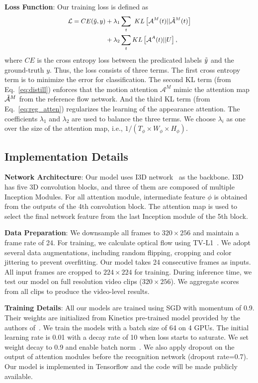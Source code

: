 \documentclass[10pt,twocolumn,letterpaper]{article}
\begin{document}
\noindent \textbf{Loss Function}: Our training loss is defined as
\begin{equation}
\small
\begin{split}
    \mathcal{L} = CE(\Tilde{y}, y) &+ \lambda_1 \sum_t\  KL\left[ \mathcal{A}^M(t)||\mathcal{\Tilde{A}}^M(t) \right] \\
                  & + \lambda_2 \sum_t KL\left[ \mathcal{A}^A(t)||U \right],
\end{split}
\end{equation}
where $CE$ is the cross entropy loss between the predicated labels $\Tilde{y}$ and the ground-truth $y$. Thus, the loss consists of three terms. The first cross entropy term is to minimize the error for classification. The second KL term (from Eq.\ \ref{eq:distill}) enforces that the motion attention $\mathcal{A}^M$ mimic the attention map $\mathcal{\Tilde{A}}^M$ from the reference flow network. And the third KL term (from Eq.\ \ref{eq:reg_atten}) regularizes the learning of the appearance attention. The coefficients $\lambda_1$ and $\lambda_2$ are used to balance the three terms. We choose $\lambda_{i}$ as one over the size of the attention map, i.e., $1/(T_\phi\times W_\phi\times H_\phi)$.


\subsection{Implementation Details}
\noindent \textbf{Network Architecture}: 
Our model uses I3D network~\cite{carreira2017quo} as the backbone. I3D has five 3D convolution blocks, and three of them are composed of multiple Inception Modules. For all attention module, intermediate feature $\phi$ is obtained from the outputs of the 4th convolution block. The attention map is used to select the final network feature from the last Inception module of the 5th block.

\noindent \textbf{Data Preparation}:
We downsample all frames to $320\times256$ and maintain a frame rate of 24. For training, we calculate optical flow using TV-L1~\cite{perez2013tv}. We adopt several data augmentations, including random flipping, cropping and color jittering to prevent overfitting. Our model takes 24 consecutive frames as inputs. All input frames are cropped to $224\times224$ for training. During inference time, we test our model on full resolution video clips ($320\times256$). We aggregate scores from all clips to produce the video-level results.

\noindent \textbf{Training Details}:
All our models are trained using SGD with momentum of 0.9. Their weights are initialized from Kinetics pre-trained model provided by the authors of~\cite{carreira2017quo}. We train the models with a batch size of 64 on 4 GPUs. The initial learning rate is 0.01 with a decay rate of 10 when loss starts to saturate. We set weight decay to 0.9 and enable batch norm~\cite{ioffe2009batch}. We also apply dropout on the output of attention modules before the recognition network (dropout rate=0.7). Our model is implemented in Tensorflow and the code will be made publicly available.
\end{document}
